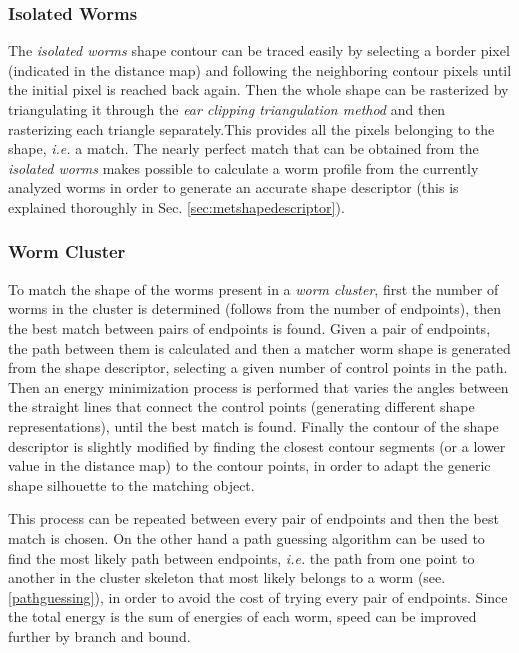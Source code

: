 \subsubsection*{Isolated Worms}
The \emph{isolated worms} shape contour can be traced easily by selecting a border pixel
(indicated in the distance map) and following the neighboring contour pixels until the
initial pixel is reached back again. Then the whole shape can be rasterized by 
triangulating it through the \emph{ear clipping triangulation method} and then rasterizing
each triangle separately.This provides all the pixels belonging to the shape, 
\emph{i.e.} a match.
The nearly perfect match that can be obtained from the \emph{isolated worms} makes 
possible to calculate a worm profile from the currently analyzed worms in order to
generate an accurate shape descriptor (this is explained thoroughly in 
Sec. \ref{sec:metshapedescriptor}).

\subsubsection*{Worm Cluster}
To match the shape of the worms present in a \emph{worm cluster}, first the number of worms in the cluster is determined (follows from the number of
endpoints), then the best match between pairs of endpoints is found. Given a pair of 
endpoints, the path between them is calculated and then a matcher worm shape is generated
from the shape descriptor, selecting a given number of control points in the path.
Then an energy minimization process is performed that varies the angles between the 
straight lines that connect the control points (generating different shape representations),
until the best match is found. Finally the contour of the shape descriptor is slightly 
modified by finding the closest contour segments (or a lower value in the distance map)
to the contour points, in order to adapt the generic shape silhouette to 
the matching object. 

This process can be repeated between every pair of endpoints and then the best match is chosen.
On the other hand a path guessing algorithm
can be used to find the most likely path between endpoints, \emph{i.e.} the path from
one point to another in the cluster skeleton that most likely belongs to a worm 
(see. \ref{pathguessing}), in order to avoid the cost of trying every pair of endpoints. Since the total energy is
the sum of energies of each worm, speed can be improved further by branch and bound.\\

